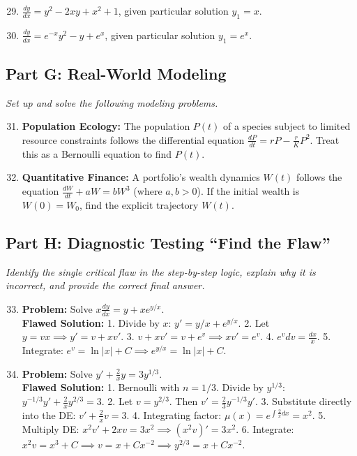 \documentclass[12pt]{article}
\begin{document}
\begin{enumerate}
    \setcounter{enumi}{28}
    \item $\frac{dy}{dx} = y^2 - 2xy + x^2 + 1$, given particular solution $y_1 = x$.
    \item $\frac{dy}{dx} = e^{-x} y^2 - y + e^x$, given particular solution $y_1 = e^x$.
\end{enumerate}

\subsection*{Part G: Real-World Modeling}
\textit{Set up and solve the following modeling problems.}

\begin{enumerate}
    \setcounter{enumi}{30}
    \item \textbf{Population Ecology:} The population $P(t)$ of a species subject to limited resource constraints follows the differential equation $\frac{dP}{dt} = rP - \frac{r}{K}P^2$. Treat this as a Bernoulli equation to find $P(t)$.
    \item \textbf{Quantitative Finance:} A portfolio's wealth dynamics $W(t)$ follows the equation $\frac{dW}{dt} + aW = bW^3$ (where $a,b > 0$). If the initial wealth is $W(0) = W_0$, find the explicit trajectory $W(t)$.
\end{enumerate}

\subsection*{Part H: Diagnostic Testing ``Find the Flaw''}
\textit{Identify the single critical flaw in the step-by-step logic, explain why it is incorrect, and provide the correct final answer.}

\begin{enumerate}
    \setcounter{enumi}{32}
    \item \textbf{Problem:} Solve $x \frac{dy}{dx} = y + x e^{y/x}$. \\
    \textbf{Flawed Solution:}
    1. Divide by $x$: $y' = y/x + e^{y/x}$.
    2. Let $y=vx \implies y' = v + x v'$.
    3. $v + x v' = v + e^v \implies x v' = e^v$.
    4. $e^v dv = \frac{dx}{x}$.
    5. Integrate: $e^v = \ln|x| + C \implies e^{y/x} = \ln|x| + C$.
    
    \item \textbf{Problem:} Solve $y' + \frac{2}{x}y = 3 y^{1/3}$. \\
    \textbf{Flawed Solution:}
    1. Bernoulli with $n=1/3$. Divide by $y^{1/3}$: $y^{-1/3} y' + \frac{2}{x} y^{2/3} = 3$.
    2. Let $v = y^{2/3}$. Then $v' = \frac{2}{3} y^{-1/3} y'$.
    3. Substitute directly into the DE: $v' + \frac{2}{x} v = 3$.
    4. Integrating factor: $\mu(x) = e^{\int \frac{2}{x}dx} = x^2$.
    5. Multiply DE: $x^2 v' + 2x v = 3x^2 \implies (x^2 v)' = 3x^2$.
    6. Integrate: $x^2 v = x^3 + C \implies v = x + C x^{-2} \implies y^{2/3} = x + C x^{-2}$.
\end{enumerate}
\end{document}
